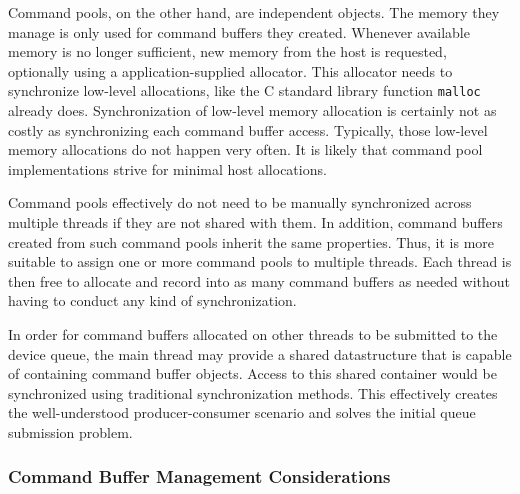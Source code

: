       Command pools, on the other hand, are independent objects.
      The memory they manage is only used for command buffers they created.
      Whenever available memory is no longer sufficient, new memory from the host is requested, optionally using a application-supplied allocator.
      This allocator needs to synchronize low-level allocations, like the C standard library function \lstinline{malloc} already does.
      Synchronization of low-level memory allocation is certainly not as costly as synchronizing each command buffer access.
      Typically, those low-level memory allocations do not happen very often.
      It is likely that command pool implementations strive for minimal host allocations.

      Command pools effectively do not need to be manually synchronized across multiple threads if they are not shared with them.
      In addition, command buffers created from such command pools inherit the same properties.
      Thus, it is more suitable to assign one or more command pools to multiple threads.
      Each thread is then free to allocate and record into as many command buffers as needed without having to conduct any kind of synchronization.

      In order for command buffers allocated on other threads to be submitted to the device queue, the main thread may provide a shared datastructure that is capable of containing command buffer objects.
      Access to this shared container would be synchronized using traditional synchronization methods.
      This effectively creates the well-understood producer-consumer scenario\cite{EWD:EWD329} and solves the initial queue submission problem.

      \subsubsection{Command Buffer Management Considerations}

